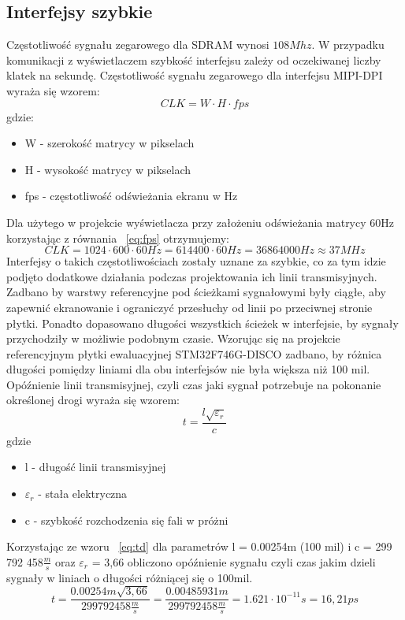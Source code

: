 \documentclass[eng,printmode]{mgr}
\begin{document}
\subsection*{Interfejsy szybkie}
Częstotliwość sygnału zegarowego dla SDRAM wynosi $108Mhz$. W przypadku komunikacji z wyświetlaczem szybkość interfejsu zależy od oczekiwanej liczby klatek na sekundę. Częstotliwość sygnału zegarowego dla interfejsu MIPI-DPI wyraża się wzorem:
\begin{equation}
CLK = W \cdot H \cdot fps \label{eq:fps}
\end{equation}
gdzie:
\begin{itemize}
  \item W - szerokość matrycy w pikselach
  \item H - wysokość matrycy w pikselach
  \item fps - częstotliwość odświeżania ekranu w Hz
\end{itemize}

Dla użytego w projekcie wyświetlacza przy założeniu odświeżania matrycy 60Hz korzystając z równania ~\ref{eq:fps} otrzymujemy:
$$
CLK = 1024 \cdot 600 \cdot 60Hz = 614400 \cdot 60Hz = 36864000 Hz \approx 37MHz
$$
Interfejsy o takich częstotliwościach zostały uznane za szybkie, co za tym idzie podjęto dodatkowe działania podczas projektowania ich linii transmisyjnych. Zadbano by warstwy referencyjne pod ścieżkami sygnałowymi były ciągłe, aby zapewnić ekranowanie i ograniczyć przesłuchy od linii po przeciwnej stronie płytki. Ponadto dopasowano długości wszystkich ścieżek w interfejsie, by sygnały przychodziły w możliwie podobnym czasie. Wzorując się na projekcie referencyjnym płytki ewaluacyjnej STM32F746G-DISCO zadbano, by różnica długości pomiędzy liniami dla obu interfejsów nie była większa niż 100 mil. Opóźnienie linii transmisyjnej, czyli czas jaki sygnał potrzebuje na pokonanie określonej drogi wyraża się wzorem:
\begin{equation}
t = \frac{l \sqrt{\varepsilon_r}}{c} \label{eq:td}
\end{equation}
gdzie
\begin{itemize}
  \item l - długość linii transmisyjnej
  \item \textbf{$\varepsilon_r$} - stała elektryczna 
  \item c - szybkość rozchodzenia się fali w próżni
\end{itemize}
Korzystając ze wzoru ~\ref{eq:td} dla parametrów l = 0.00254m (100 mil) i c = 299 792 458$\frac{m}{s}$ oraz $\varepsilon_r$ = 3,66 obliczono opóźnienie sygnału czyli czas jakim dzieli sygnały w liniach o długości różniącej się o 100mil.
$$
t = \frac{0.00254m \sqrt{3,66}}{299 792 458\frac{m}{s}} = \frac{0.00485931m}{299 792 458\frac{m}{s}} = 1.621\cdot10^{-11}s = 16,21 ps
$$
\end{document}
